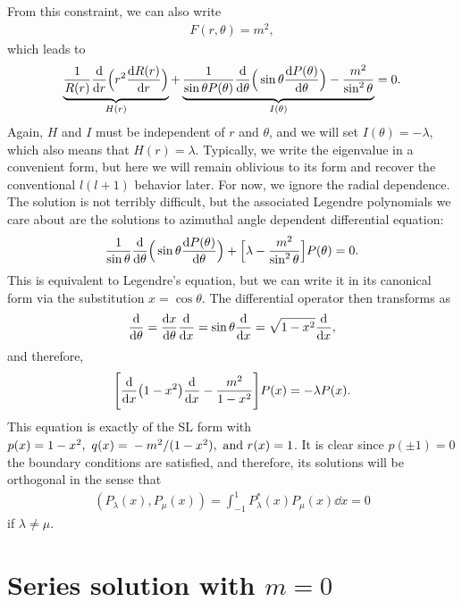 From this constraint, we can also write
\begin{align}
    F(r,\theta) = m^2
,\end{align}
which leads to
\begin{align}
    \underbrace{ \frac{1}{R(r)}\dv{r} \Big( r^2 \dv{R(r)}{r} \Big) }_{ H(r) } + \underbrace{ \frac{1}{\sin{\theta} P(\theta)} \dv{\theta} \Big( \sin{\theta} \dv{P(\theta)}{\theta} \Big) - \frac{m^2}{\sin^2{\theta}} }_{ I(\theta) } = 0
.\end{align}
Again, $H$ and $I$ must be independent of $r$ and $\theta$, and we will set $I(\theta) = -\lambda$, which also means that $H(r) = \lambda$.
Typically, we write the eigenvalue in a convenient form, but here we will remain oblivious to its form and recover the conventional $l(l+1)$ behavior later.
For now, we ignore the radial dependence.
The solution is not terribly difficult, but the associated Legendre polynomials we care about are the solutions to azimuthal angle dependent differential equation:
\begin{align}
    \frac{1}{\sin{\theta}} \dv{\theta}\Big( \sin{\theta} \dv{P(\theta)}{\theta} \Big) + \Big[ \lambda - \frac{m^2}{\sin^2{\theta}} \Big] P(\theta) = 0
.\end{align}
This is equivalent to Legendre's equation, but we can write it in its canonical form via the substitution $x = \cos{\theta}$.
The differential operator then transforms as
\begin{eqnarray}
    \dv{\theta} = \dv{x}{\theta} \dv{x} = \sin{\theta} \dv{x} = \sqrt{1 - x^2} \dv{x}
,\end{eqnarray}
and therefore,
\begin{eqnarray}
    \label{eq:associated-legendre-eq}
    \Bigg[ \dv{x} (1 - x^2) \dv{x} - \frac{m^2}{1-x^2} \Bigg] P(x) = -\lambda P(x)
.\end{eqnarray}
This equation is exactly of the SL form with $p(x) = 1 - x^2,~ q(x) = \\ -m^2/(1-x^2),~{\rm and}~r(x) = 1$.
It is clear since $p(\pm 1) = 0$ the boundary conditions are satisfied, and therefore, its solutions will be orthogonal in the sense that
\begin{eqnarray}
    (P_{\lambda}(x),P_{\mu}(x)) = \int_{-1}^{1} P_{\lambda}^{*}(x) P_{\mu}(x) \dd{x} = 0
\end{eqnarray}
if $\lambda \ne \mu$.


\section{Series solution with $m=0$}

